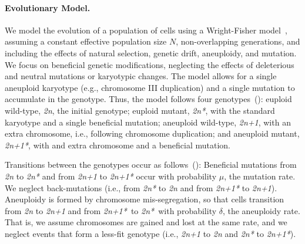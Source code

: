 \documentclass[12pt]{extarticle}
\newcommand{\euwt}{\emph{2n}}
\newcommand{\anwt}{\emph{2n+1}}
\newcommand{\eumt}{\emph{2n*}}
\newcommand{\anmt}{\emph{2n+1*}}
\begin{document}
\paragraph*{Evolutionary Model.}
We model the evolution of a population of cells using a Wright-Fisher model~\citep{Otto2007}, assuming a constant effective population size $N$, non-overlapping generations, and including the effects of natural selection, genetic drift, aneuploidy, and mutation. 
We focus on beneficial genetic modifications, neglecting the effects of deleterious and neutral mutations or karyotypic changes.
The model allows for a single aneuploid karyotype (e.g., chromosome III duplication) and a single mutation to accumulate in the genotype.
Thus, the model follows four genotypes~(): euploid wild-type, \euwt, the initial genotype; 
euploid mutant, \eumt, with the standard karyotype and a single beneficial mutation; 
aneuploid wild-type, \anwt, with an extra chromosome, i.e., following chromosome duplication; and
aneuploid mutant, \anmt, with and extra chromosome and a beneficial mutation. 

Transitions between the genotypes occur as follows~(): Beneficial mutations from \euwt\; to \eumt\; and from \anwt\; to \anmt\; occur with probability $\mu$, the mutation rate. We neglect back-mutations (i.e., from \eumt\; to \euwt\; and from \anmt\; to \anwt).
Aneuploidy is formed by chromosome mis-segregation, so that cells transition from \euwt\; to \anwt\; and from \anmt\ to \eumt\ with probability $\delta$, the aneuploidy rate. That is, we assume chromosomes are gained and lost at the same rate, and we neglect events that form a less-fit genotype (i.e., \anwt\; to \euwt\; and \eumt\; to \anmt).
\end{document}

